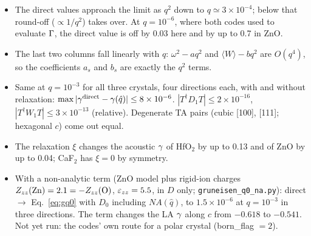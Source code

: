 \documentclass[11pt,a4paper]{article}
\begin{document}
\begin{itemize}
\item The direct values approach the limit as $q^2$ down to $q\simeq3\times10^{-4}$; below that round-off
  ($\propto1/q^2$) takes over. At $q=10^{-6}$, where both codes used to evaluate $\Gamma$, the direct value is off
  by $0.03$ here and by up to 0.7 in ZnO.
\item The last two columns fall linearly with $q$: $\omega^2-a q^2$ and $\langle W\rangle-bq^2$ are $O(q^4)$, so the
  coefficients $a_s$ and $b_s$ are exactly the $q^2$ terms.
\item Same at $q=10^{-3}$ for all three crystals, four directions each, with and without relaxation:
  $\max|\gamma^{\rm direct}-\gamma(\hat q)|\le8\times10^{-6}$. $|T^\dagger D_1T|\le2\times10^{-16}$, $|T^\dagger W_1T|\le3\times10^{-13}$
  (relative). Degenerate TA pairs (cubic [100], [111]; hexagonal $c$) come out equal.
\item The relaxation $\xi$ changes the acoustic $\gamma$ of HfO$_2$ by up to 0.13 and of ZnO by up to 0.04; CaF$_2$
  has $\xi=0$ by symmetry.
\item With a non-analytic term (ZnO model plus rigid-ion charges $Z_{zz}({\rm Zn})=2.1=-Z_{zz}({\rm O})$,
  $\varepsilon_{zz}=5.5$, in $D$ only; \texttt{gruneisen\_q0\_na.py}): direct $\to$ Eq.~\eqref{eq:gq0} with $D_0$ including
  $NA(\hat q)$, to $1.5\times10^{-6}$ at $q=10^{-3}$ in three directions. The term changes the LA $\gamma$ along $c$
  from $-0.618$ to $-0.541$. Not yet run: the codes' own route for a polar crystal (born\_flag $=2$).
\end{itemize}
\end{document}

